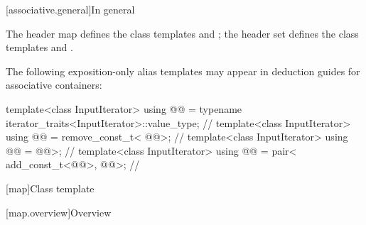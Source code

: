 \documentclass{wg21}
\begin{document}
[associative.general]{In general}

\pnum
The header map defines the class templates  and
; the header set defines the class templates
 and .

\pnum
The following exposition-only alias templates may appear in deduction guides for associative containers:
\begin{codeblock}
    template<class InputIterator>
    using @@ =
    typename iterator_traits<InputIterator>::value_type;                // \expos
    template<class InputIterator>
    using @@ = remove_const_t<
    @@>;   // \expos
    template<class InputIterator>
    using @@ =
    @@>;   // \expos
    template<class InputIterator>
    using @@ = pair<
    add_const_t<@@>,
    @@>;  // \expos
\end{codeblock}

[map]{Class template }

[map.overview]{Overview}
\end{document}
